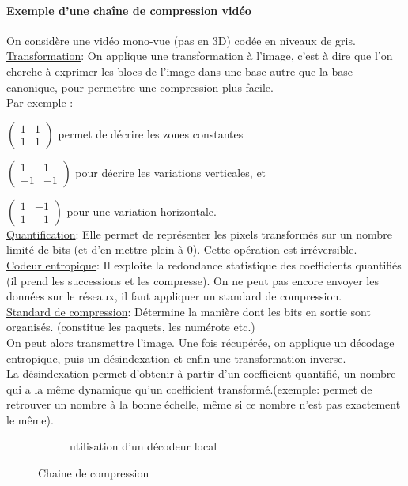 \documentclass[main.tex]{subfiles}
\begin{document}
\paragraph{Exemple d'une chaîne de compression vidéo}
On considère une vidéo mono-vue (pas en 3D) codée en niveaux de gris.\\

\underline{Transformation}: On applique une transformation à l'image, c'est à dire que l'on cherche à exprimer les blocs de l'image dans une base autre que la base canonique, pour permettre une compression plus facile.\\
Par exemple :

$\begin{pmatrix}1&1\\1&1\end{pmatrix}$ permet de décrire les zones constantes

$\begin{pmatrix}1&1\\-1&-1\end{pmatrix}$ pour décrire les variations verticales, et

$\begin{pmatrix}1&-1\\1&-1\end{pmatrix}$ pour une variation horizontale.\\

\underline{Quantification}: Elle permet de représenter les pixels transformés sur un nombre limité de bits (et d'en mettre plein à 0). Cette opération est irréversible.\\

\underline{Codeur entropique}: Il exploite la redondance statistique des coefficients quantifiés (il prend les successions et les compresse). On ne peut pas encore envoyer les données sur le réseaux, il faut appliquer un standard de compression.\\

\underline{Standard de compression}: Détermine la manière dont les bits en sortie sont organisés. (constitue les paquets, les numérote etc.)\\


On peut alors transmettre l'image. Une fois récupérée, on applique un décodage entropique, puis un désindexation et enfin une transformation inverse.\\

La désindexation permet d'obtenir à partir d'un coefficient quantifié, un nombre qui a la même dynamique qu'un coefficient transformé.(exemple: permet de retrouver un nombre à la bonne échelle, même si ce nombre n'est pas exactement le même).
\begin{figure}[H]
  \centering
{}
\begin{figure}[H]
  \centering

  \caption{utilisation d'un décodeur local}
\end{figure}
\caption{Chaine de compression}
\end{figure}
\end{document}
